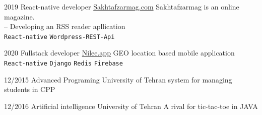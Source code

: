 \documentclass[9pt]{developercv}
\begin{document}


\begin{entrylist}
	\entry
	{2019}
	{React-native developer}
	{{\href{https://www.sakhtafzarmag.com/}{Sakhtafzarmag.com}}}
	{
		Sakhtafzarmag is an online magazine. \\
		-- Developing an RSS reader apllication \\
		\texttt{React-native}\slashsep
		\texttt{Wordpress-REST-Api}\slashsep
	}
\end{entrylist}
\begin{entrylist}
	\entry
	{2020}
	{Fullstack developer}
	{{\href{https://www.nilee.app/}{Nilee.app}}}
	{
		GEO location based mobile application \\
		\texttt{React-native}\slashsep
		\texttt{Django}\slashsep
		\texttt{Redis}\slashsep
		\texttt{Firebase}
	}
\end{entrylist}




\begin{entrylist}
	\entry
	{12/2015}
	{Advanced Programing}
	{University of Tehran}
	{system for managing students in CPP}
\end{entrylist}
\begin{entrylist}
	\entry
	{12/2016}
	{Artificial intelligence}
	{University of Tehran}
	{A rival for tic-tac-toe in JAVA}
\end{entrylist}




\hfill
\end{document}
